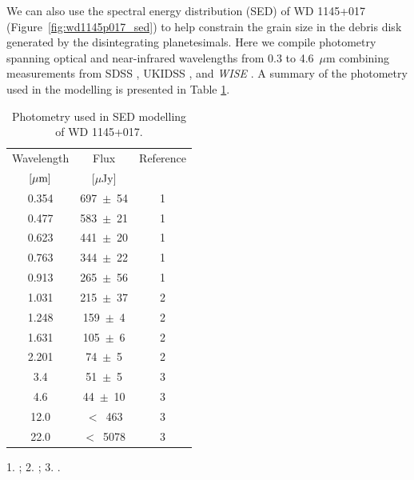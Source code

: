 \documentclass[useAMS,usenatbib]{mn2e}
\begin{document}
We can also use the spectral energy distribution (SED) of WD 1145+017 (Figure~\ref{fig:wd1145p017_sed}) to help constrain the grain size in the debris disk generated by the disintegrating planetesimals. Here we compile photometry spanning optical and near-infrared wavelengths from 0.3 to 4.6~$\mu$m combining measurements from SDSS \citep[$ugriz$;][]{2011ApJS..193...29A}, UKIDSS \citep[$YJHK$;][]{2007MNRAS.379.1599L}, and \textit{WISE} \citep[W1 and W2 -- W3 and W4 upper limits do not constrain the SED;][]{2010AJ....140.1868W}. A summary of the photometry used in the modelling is presented in Table \ref{tab:wd1145p017_phot}. 

\begin{table}
    \centering
    \caption{Photometry used in SED modelling of WD 1145+017. \label{tab:wd1145p017_phot}}
    \begin{tabular}{ccc}
        \hline\hline
        Wavelength & Flux  & Reference \\
        $[\mu \rm m]$ & [$\mu$Jy] & \\ 
        \hline
        \phantom{0}0.354 & 697~$\pm$~54 & 1\\
        \phantom{0}0.477 & 583~$\pm$~21 & 1\\
        \phantom{0}0.623 & 441~$\pm$~20 & 1\\
        \phantom{0}0.763 & 344~$\pm$~22 & 1\\
        \phantom{0}0.913 & 265~$\pm$~56 & 1\\
        \phantom{0}1.031 & 215~$\pm$~37 & 2\\
        \phantom{0}1.248 & 159~$\pm$~\phantom{0}4 & 2\\
        \phantom{0}1.631 & 105~$\pm$~\phantom{0}6 & 2\\
        \phantom{0}2.201 & \phantom{0}74~$\pm$~\phantom{0}5 & 2\\
        \phantom{0}3.4\phantom{00} & \phantom{0}51~$\pm$~\phantom{0}5 & 3\\
        \phantom{0}4.6\phantom{00} & \phantom{0}44~$\pm$~10 & 3\\
        12.0\phantom{00} & $<$~\phantom{0}463 & 3\\
        22.0\phantom{00} & $<$~5078 & 3\\
        \hline
    \end{tabular}
    \begin{flushleft}
    1. \cite{2011ApJS..193...29A}; 2. \cite{2007MNRAS.379.1599L}; 3. \cite{2010AJ....140.1868W}.
    \end{flushleft}
\end{table}
\end{document}
